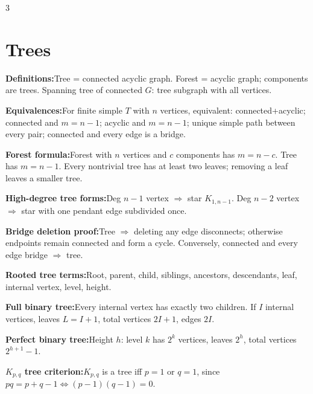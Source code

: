 \documentclass[10pt]{article}
\newenvironment{cheatitems}{\par\vspace{-1pt}}{\par\vspace{-1pt}}
\newcommand{\cheatrow}[2]{\par\noindent\textbf{#1:}\enspace #2\par}
\begin{document}
\begin{multicols}{3}
\section*{Trees}
\begin{cheatitems}
\cheatrow{Definitions}{Tree = connected acyclic graph. Forest = acyclic graph; components are trees. Spanning tree of connected $G$: tree subgraph with all vertices.}
\cheatrow{Equivalences}{For finite simple $T$ with $n$ vertices, equivalent: connected+acyclic; connected and $m=n-1$; acyclic and $m=n-1$; unique simple path between every pair; connected and every edge is a bridge.}
\cheatrow{Forest formula}{Forest with $n$ vertices and $c$ components has $m=n-c$. Tree has $m=n-1$. Every nontrivial tree has at least two leaves; removing a leaf leaves a smaller tree.}
\cheatrow{High-degree tree forms}{Deg $n-1$ vertex $\Rightarrow$ star $K_{1,n-1}$. Deg $n-2$ vertex $\Rightarrow$ star with one pendant edge subdivided once.}
\cheatrow{Bridge deletion proof}{Tree $\Rightarrow$ deleting any edge disconnects; otherwise endpoints remain connected and form a cycle. Conversely, connected and every edge bridge $\Rightarrow$ tree.}
\cheatrow{Rooted tree terms}{Root, parent, child, siblings, ancestors, descendants, leaf, internal vertex, level, height.}
\cheatrow{Full binary tree}{Every internal vertex has exactly two children. If $I$ internal vertices, leaves $L=I+1$, total vertices $2I+1$, edges $2I$.}
\cheatrow{Perfect binary tree}{Height $h$: level $k$ has $2^k$ vertices, leaves $2^h$, total vertices $2^{h+1}-1$.}
\cheatrow{$K_{p,q}$ tree criterion}{$K_{p,q}$ is a tree iff $p=1$ or $q=1$, since $pq=p+q-1\iff(p-1)(q-1)=0$.}
\end{cheatitems}


\end{multicols}
\end{document}
